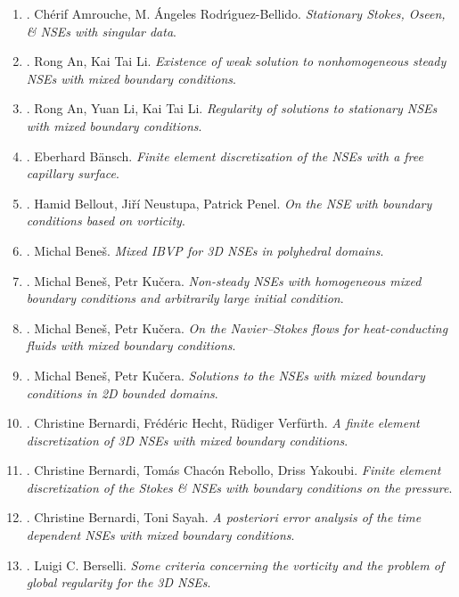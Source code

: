 \documentclass{article}
\begin{document}
\begin{enumerate}
	\item \cite{Amrouche_Rodriguez-Bellido2011}. {\sc Ch\'{e}rif Amrouche, M. \'{A}ngeles Rodr\'{\i}guez-Bellido}. {\it Stationary Stokes, Oseen, \& NSEs with singular data}.
	\item \cite{An_Li2009}. {\sc Rong An, Kai Tai Li}. {\it Existence of weak solution to nonhomogeneous steady NSEs with mixed boundary conditions}.
	\item \cite{An_Li_Li2009}. {\sc Rong An, Yuan Li, Kai Tai Li}. {\it Regularity of solutions to stationary NSEs with mixed boundary conditions}.
	\item \cite{Bansch2001}. {\sc Eberhard B\"{a}nsch}. {\it Finite element discretization of the NSEs with a free capillary surface}.
	\item \cite{Bellout_Neustupa_Penel2004}. {\sc Hamid Bellout, Ji\v{r}\'i Neustupa, Patrick Penel}. {\it On the NSE with boundary conditions based on vorticity}.
	\item \cite{Benes2011}. {\sc Michal Bene\v{s}}. {\it Mixed IBVP for 3D NSEs in polyhedral domains}.
	\item \cite{Benes_Kucera2007}. {\sc Michal Bene\v{s}, Petr Ku\v{c}era}. {\it Non-steady NSEs with homogeneous mixed boundary conditions and arbitrarily large initial condition}.
	\item \cite{Benes_Kucera2012}. {\sc Michal Bene\v{s}, Petr Ku\v{c}era}. {\it On the Navier--Stokes flows for heat-conducting fluids with mixed boundary conditions}.
	\item \cite{Benes_Kucera2016}. {\sc Michal Bene\v{s}, Petr Ku\v{c}era}. {\it Solutions to the NSEs with mixed boundary conditions in 2D bounded domains}.	
	\item \cite{Bernardi_Hecht_Verfurth2009}. {\sc Christine Bernardi, Fr\'{e}d\'{e}ric Hecht, R\"{u}diger Verf\"{u}rth}. {\it A finite element discretization of 3D NSEs with mixed boundary conditions}.
	\item \cite{Bernardi_Rebollo_Yakoubi2015}. {\sc Christine Bernardi, Tom\'{a}s Chac\'{o}n Rebollo, Driss Yakoubi}. {\it Finite element discretization of the Stokes \& NSEs with boundary conditions on the pressure}.
	\item \cite{Bernardi_Rebollo_Yakoubi2015}. {\sc Christine Bernardi, Toni Sayah}. {\it A posteriori error analysis of the time dependent NSEs with mixed boundary conditions}.
	\item \cite{Berselli2009}. {\sc Luigi C. Berselli}. {\it Some criteria concerning the vorticity and the problem of global regularity for the 3D NSEs}.

\end{enumerate}
\end{document}
